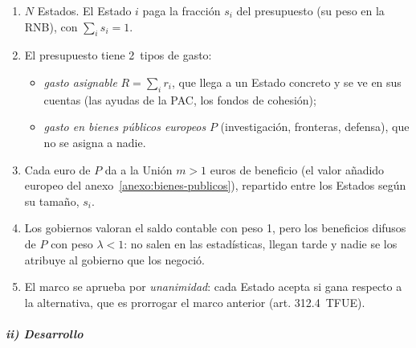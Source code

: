 \documentclass[11pt]{article}
\begin{document}
\begin{enumerate}
\item $N$ Estados. El Estado $i$ paga la fracción $s_i$ del presupuesto (su peso en la RNB), con $\sum_i s_i=1$.
\item El presupuesto tiene 2~tipos de gasto:
  \begin{itemize}
  \item \emph{gasto asignable} $R=\sum_i r_i$, que llega a un Estado concreto y se ve en sus cuentas (las ayudas de la PAC, los fondos de cohesión);
  \item \emph{gasto en bienes públicos europeos} $P$ (investigación, fronteras, defensa), que no se asigna a nadie.
  \end{itemize}
\item Cada euro de $P$ da a la Unión $m>1$ euros de beneficio (el valor añadido europeo del anexo~\ref{anexo:bienes-publicos}), repartido entre los Estados según su tamaño, $s_i$.
\item Los gobiernos valoran el saldo contable con peso 1, pero los beneficios difusos de $P$ con peso $\lambda<1$: no salen en las estadísticas, llegan tarde y nadie se los atribuye al gobierno que los negoció.
\item El marco se aprueba por \emph{unanimidad}: cada Estado acepta si gana respecto a la alternativa, que es prorrogar el marco anterior (art. 312.4~TFUE).
\end{enumerate}

\subparagraph{ii) Desarrollo}
\end{document}
